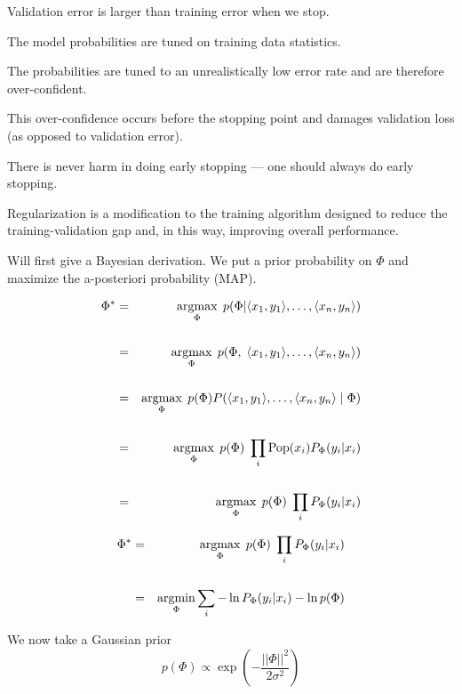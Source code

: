 {\vfill
Validation error is larger than training error when we stop.

\vfill
The model probabilities are tuned on training data statistics.

\vfill
The probabilities are tuned to an unrealistically low error rate and are therefore over-confident.

\vfill
This over-confidence occurs before the stopping point and damages validation loss (as opposed to validation error).


There is never harm in doing early stopping --- one should always do early stopping.

\vfill
Regularization is a modification to the training algorithm designed to reduce the training-validation gap and, in this way, improving overall performance.


Will first give a Bayesian derivation. We put a prior probability on $\Phi$ and maximize the a-posteriori probability (MAP).

\vfill
{\huge
\begin{eqnarray*}
\Phi^* & = & \operatorname*{argmax}_\Phi\;p(\Phi | {\mbox{$\langle x_1,y_1\rangle$}},\ldots,{\mbox{$\langle x_n,y_n\rangle$}}) \\
\\
 & = & \operatorname*{argmax}_\Phi\;p(\Phi,\;{\mbox{$\langle x_1,y_1\rangle$}},\ldots,{\mbox{$\langle x_n,y_n\rangle$}}) \\
 \\
  & = & \operatorname*{argmax}_\Phi\;p(\Phi)P({\mbox{$\langle x_1,y_1\rangle$}},\ldots,{\mbox{$\langle x_n,y_n\rangle$}}\;|\;\Phi) \\
 \\
 & = & \operatorname*{argmax}_\Phi \; p(\Phi)\;\prod_i \mathrm{Pop}(x_i)P_\Phi(y_i|x_i) \\
 \\
  & = & \operatorname*{argmax}_\Phi \; p(\Phi)\;\prod_i P_\Phi(y_i|x_i)
 \end{eqnarray*}
}


\begin{eqnarray*}
\Phi^*   & = & \operatorname*{argmax}_\Phi \; p(\Phi)\;\prod_i P_\Phi(y_i|x_i) \\
\\
& = & \operatorname*{argmin}_\Phi \sum_i - \ln P_\Phi(y_i|x_i) -\ln  p(\Phi)
\end{eqnarray*}

\vfill
We now take a Gaussian prior {\color{red} $$p(\Phi) \propto \exp\left(-\frac{||\Phi||^2}{2\sigma^2}\right)$$}

}
